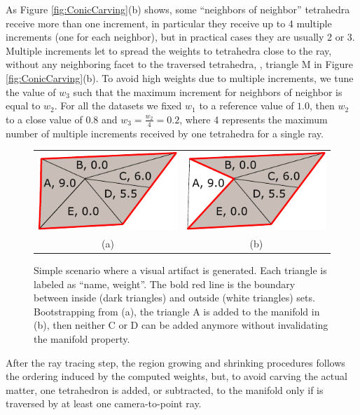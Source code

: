As Figure \ref{fig:ConicCarving}(b) shows, some ``neighbors of neighbor'' tetrahedra receive more than one increment, in particular they receive up to 4 multiple increments (one for each neighbor), but in practical cases they are usually 2 or 3.
Multiple increments let to spread the weights to tetrahedra close to the ray, without any  neighboring facet to the traversed tetrahedra, \eg,  triangle M in Figure \ref{fig:ConicCarving}(b).
To avoid high weights due to multiple increments, we tune the value of $w_3$ such that the maximum increment for neighbors of neighbor is equal to $w_2$.
For all the datasets we fixed $w_1$ to a reference value of $1.0$, then $w_2$ to a close value of $0.8$ and $w_3 = \frac{w_2}{4} = 0.2$, where 4 represents the maximum number of multiple increments received by one tetrahedra for a single ray. 


\begin{figure}
\centering
\begin{tabular}{cc}
\includegraphics[width=0.35\columnwidth]{./img//artifacts01}&
\includegraphics[width=0.35\columnwidth]{./img//artifacts02}\\
(a) & (b)
\end{tabular}
\caption{Simple scenario where a visual artifact is generated. Each triangle is labeled as ``name, weight''. The bold red line is the boundary between inside (dark triangles) and outside (white triangles) sets. Bootstrapping from (a), the triangle A is added to the manifold in (b), then neither C or D can be added anymore without invalidating the manifold property.}
\label{fig:artifact}
\end{figure}

After the ray tracing step, the region growing and shrinking procedures follows the ordering induced by the computed weights, but, to avoid carving the actual matter, one tetrahedron is added, or subtracted, to the manifold only if is traversed by at least one camera-to-point ray.




